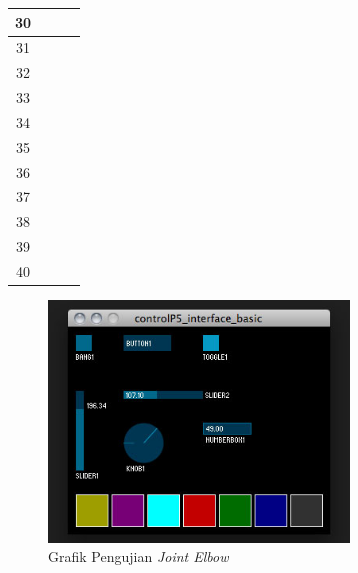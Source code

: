 \begin{table}[]
\begin{tabular}{|c|c|c|c|}
 		30 &                                                                                     &              &       \\ \hline
 		31 &                                                                                     &              &       \\ \hline
 		32 &                                                                                     &              &       \\ \hline
 		33 &                                                                                     &              &       \\ \hline
 		34 &                                                                                     &              &       \\ \hline
 		35 &                                                                                     &              &       \\ \hline
 		36 &                                                                                     &              &       \\ \hline
 		37 &                                                                                     &              &       \\ \hline
 		38 &                                                                                     &              &       \\ \hline
 		39 &                                                                                     &              &       \\ \hline
 		40 &                                                                                     &              &       \\ \hline
 	\end{tabular}
 	
 \end{table} 
 \begin{figure}[H]
 	\centering
 	\includegraphics[width=8cm]{gambar/controlp5.jpg}
 	\caption{Grafik Pengujian \textit{Joint Elbow}}
 	\label{pic.jointelbow}
 \end{figure}
 

